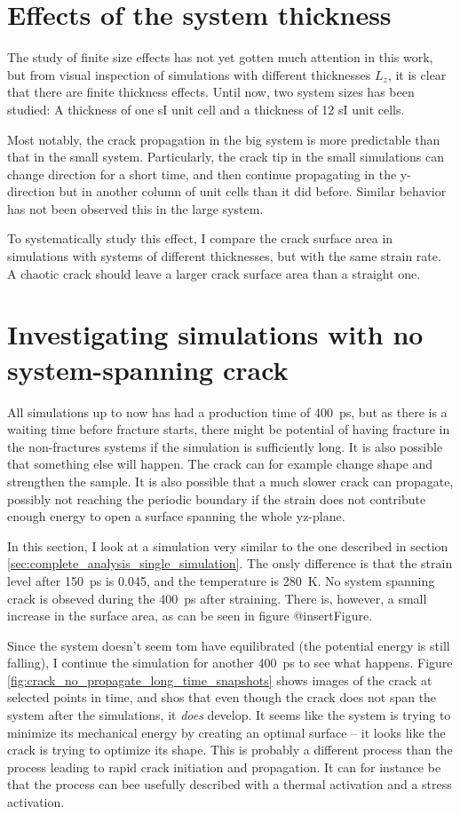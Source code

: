 \section{Effects of the system thickness}
The study of finite size effects has not yet gotten much attention in this work, but from visual inspection of simulations with different thicknesses $L_z$, it is clear that there are finite thickness effects. Until now, two system sizes has been studied: A thickness of one sI unit cell and a thickness of 12 sI unit cells. 

Most notably, the crack propagation in the big system is more predictable than that in the small system. Particularly, the crack tip in the small simulations can change direction for a short time, and then continue propagating in the y-direction but in another column of unit cells than it did before. Similar behavior has not been observed this in the large system.


To systematically study this effect, I compare the crack surface area in simulations with systems of different thicknesses, but with the same strain rate. A chaotic crack should leave a larger crack surface area than a straight one.

\section{Investigating simulations with no system-spanning crack}
All simulations up to now has had a production time of \SI{400}{\pico\second}, but as there is a waiting time before fracture starts, there might be potential of having fracture in the non-fractures systems if the simulation is sufficiently long. It is also possible that something else will happen. The crack can for example change shape and strengthen the sample. It is also possible that a much slower crack can propagate, possibly not reaching the periodic boundary if the strain does not contribute enough energy to open a surface spanning the whole yz-plane. 

In this section, I look at a simulation very similar to the one described in section \ref{sec:complete_analysis_single_simulation}. The onsly difference is that the strain level after \SI{150}{\pico\second} is 0.045, and the temperature is \SI{280}{\kelvin}. No system spanning crack is obseved during the \SI{400}{\pico\second} after straining. There is, however, a small increase in the surface area, as can be seen in figure @insertFigure. 

Since the system doesn't seem tom have equilibrated (the potential energy is still falling), I continue the simulation for another \SI{400}{\pico\second} to see what happens. Figure \ref{fig:crack_no_propagate_long_time_snapshots} shows images of the crack at selected points in time, and shos that even though the crack does not span the system after the simulations, it \emph{does} develop. It seems like the system is trying to minimize its mechanical energy by creating an optimal surface -- it looks like the crack is trying to optimize its shape. This is probably a different process than the process leading to rapid crack initiation and propagation. It can for instance be that the process can bee usefully described with a thermal activation and a stress activation. 

